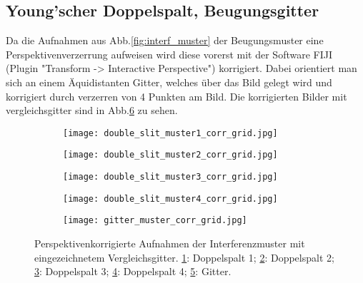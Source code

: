 \subsection{Young'scher Doppelspalt, Beugungsgitter}
Da die Aufnahmen aus Abb.\ref{fig:interf_muster} der Beugungsmuster eine Perspektivenverzerrung aufweisen wird diese vorerst mit der Software FIJI (Plugin "Transform -> Interactive Perspective") korrigiert.
Dabei orientiert man sich an einem Äquidistanten Gitter, welches über das Bild gelegt wird und korrigiert durch verzerren von 4 Punkten am Bild.
Die korrigierten Bilder mit vergleichsgitter sind in Abb.\ref{fig:interf_muster_corr_grid} zu sehen.
\begin{figure}[h]
    \centering
    \begin{subfigure}[t]{0.4\textwidth}
        \texttt{[image: double\_slit\_muster1\_corr\_grid.jpg]}
        \caption{}
        \label{fig:double_slit_muster1_corr_grid}
    \end{subfigure}%
    \begin{subfigure}[t]{0.4\textwidth}
        \texttt{[image: double\_slit\_muster2\_corr\_grid.jpg]}
        \caption{}
        \label{fig:double_slit_muster2_corr_grid}
    \end{subfigure}
    \begin{subfigure}[t]{0.4\textwidth}
        \texttt{[image: double\_slit\_muster3\_corr\_grid.jpg]}
        \caption{}
        \label{fig:double_slit_muster3_corr_grid}
    \end{subfigure}%
    \begin{subfigure}[t]{0.4\textwidth}
        \texttt{[image: double\_slit\_muster4\_corr\_grid.jpg]}
        \caption{}
        \label{fig:double_slit_muster4_corr_grid}
    \end{subfigure}
    \begin{subfigure}[t]{0.4\textwidth}
        \texttt{[image: gitter\_muster\_corr\_grid.jpg]}
        \caption{}
        \label{fig:gitter_muster_corr_grid}
    \end{subfigure}

    \caption{
        Perspektivenkorrigierte Aufnahmen der Interferenzmuster mit eingezeichnetem Vergleichsgitter.
        \ref{fig:double_slit_muster1_corr_grid}: Doppelspalt 1; 
        \ref{fig:double_slit_muster2_corr_grid}: Doppelspalt 2; 
        \ref{fig:double_slit_muster3_corr_grid}: Doppelspalt 3; 
        \ref{fig:double_slit_muster4_corr_grid}: Doppelspalt 4; 
        \ref{fig:gitter_muster_corr_grid}: Gitter.
    }
    \label{fig:interf_muster_corr_grid}
\end{figure}
